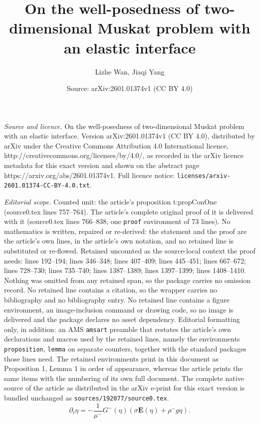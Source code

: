 \documentclass[10pt,a4paper]{amsart}
\title{On the well-posedness of two-dimensional Muskat problem with an elastic interface}
\author{Lizhe Wan, Jiaqi Yang}
\date{Source: arXiv:2601.01374v1 (CC BY 4.0)}
\newcommand{\p}{\partial}
\begin{document}
\maketitle

\noindent\emph{Source and licence.} On the well-posedness of two-dimensional Muskat problem with an elastic interface. Version arXiv:2601.01374v1 (CC BY 4.0), distributed by arXiv under the Creative Commons Attribution 4.0 International licence, http://creativecommons.org/licenses/by/4.0/, as recorded in the arXiv licence metadata for this exact version and shown on the abstract page https://arxiv.org/abs/2601.01374v1. Full licence notice: \texttt{licenses/arxiv-2601.01374-CC-BY-4.0.txt}.\par\smallskip

\noindent\textit{Editorial scope.} Counted unit: the article's proposition t:propConOne (source0.tex lines 757--764). The article's complete original proof of it is delivered with it (source0.tex lines 766--838, one \texttt{proof} environment of 73 lines). No mathematics is written, repaired or re-derived: the statement and the proof are the article's own lines, in the article's own notation, and no retained line is substituted or re-flowed.  Retained uncounted as the source-local context the proof needs: lines 192--194; lines 346--348; lines 407--409; lines 445--451; lines 667--672; lines 728--730; lines 735--740; lines 1387--1389; lines 1397--1399; lines 1408--1410.  Nothing was omitted from any retained span, so the package carries no omission record.  No retained line contains a citation, so the wrapper carries no bibliography and no bibliography entry.  No retained line contains a figure environment, an image-inclusion command or drawing code, so no image is delivered and the package declares no asset dependency.  Editorial formatting only, in addition: an AMS \texttt{amsart} preamble that restates the article's own declarations and macros used by the retained lines, namely the environments \texttt{proposition}, \texttt{lemma} on separate counters, together with the standard packages those lines need.  The retained environments print in this document as Proposition 1, Lemma 1 in order of appearance, whereas the article prints the same items with the numbering of its own full document.  The complete native source of the article as distributed in the arXiv e-print for this exact version is bundled unchanged as \texttt{sources/192077/source0.tex}.
\begin{equation} \label{OneMuskat}
    \p_t \eta = -\frac{1}{\mu^-}G^-(\eta)(\sigma \mathbf{E}(\eta)+ \rho^- g \eta).
\end{equation}
\end{document}
